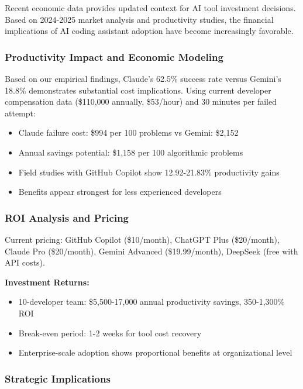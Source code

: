 \documentclass[conference]{IEEEtran}
\begin{document}
Recent economic data provides updated context for AI tool investment decisions. Based on 2024-2025 market analysis and productivity studies, the financial implications of AI coding assistant adoption have become increasingly favorable.

\subsubsection{Productivity Impact and Economic Modeling}

Based on our empirical findings, Claude's 62.5\% success rate versus Gemini's 18.8\% demonstrates substantial cost implications. Using current developer compensation data (\$110,000 annually, \$53/hour) and 30 minutes per failed attempt:

\begin{itemize}
    \item Claude failure cost: \$994 per 100 problems vs Gemini: \$2,152
    \item Annual savings potential: \$1,158 per 100 algorithmic problems
    \item Field studies with GitHub Copilot show 12.92-21.83\% productivity gains~\cite{cui2024}
    \item Benefits appear strongest for less experienced developers~\cite{peng2023}
\end{itemize}

\subsubsection{ROI Analysis and Pricing}

Current pricing: GitHub Copilot (\$10/month), ChatGPT Plus (\$20/month), Claude Pro (\$20/month), Gemini Advanced (\$19.99/month), DeepSeek (free with API costs).

\textbf{Investment Returns:}
\begin{itemize}
    \item 10-developer team: \$5,500-17,000 annual productivity savings, 350-1,300\% ROI
    \item Break-even period: 1-2 weeks for tool cost recovery
    \item Enterprise-scale adoption shows proportional benefits at organizational level
\end{itemize}

\subsubsection{Strategic Implications}
\end{document}
